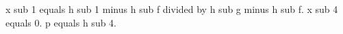 x sub 1 equals h sub 1 minus h sub f divided by h sub g minus h sub f.  
x sub 4 equals 0.  
p equals h sub 4.